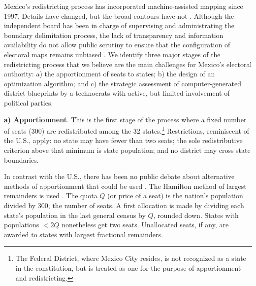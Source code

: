 \documentclass[letter,12pt]{article}
\begin{document}
Mexico's redistricting process has incorporated machine-assisted mapping since 1997. Details have changed, but the broad contours have not \citep{trelles.mtz.tesisItam.2007}. Although the independent board has been in charge of supervising and administrating the boundary delimitation process, the lack of transparency and information availability do not allow public scrutiny to ensure that the configuration of electoral maps remains unbiased \citep{trelles.datosabiertos.2015}. We identify three major stages of the redistricting process that we believe are the main challenges for Mexico's electoral authority: a) the apportionment of seats to states; b) the design of an optimization algorithm; and c) the strategic assessment of computer-generated district blueprints by a technocrats with active, but limited involvement of political parties.


\textbf{a) Apportionment}. This is the first stage of the process where a fixed number of seats (300) are redistributed among the 32 states.\footnote{The Federal District, where Mexico City resides, is not recognized as a state in the constitution, but is treated as one for the purpose of apportionment and redistricting.} Restrictions, reminiscent of the U.S., apply: no state may have fewer than two seats; the sole redistributive criterion above that minimum is state population; and no district may cross state boundaries.  

In contrast with the U.S., there has been no public debate about alternative methods of apportionment that could be used \citep{szpiro.numbersRule.2010,balinski.rodriguez.1996}. The Hamilton method of largest remainders is used \citep[][:10]{balinskiYoung2001FairRep}. The quota $Q$ (or price of a seat) is the nation's population divided by 300, the number of seats. A first allocation is made by dividing each state's population in the last general census by $Q$, rounded down. States with populations $<2Q$ nonetheless get two seats. Unallocated seats, if any, are awarded to states with largest fractional remainders. 
\end{document}
